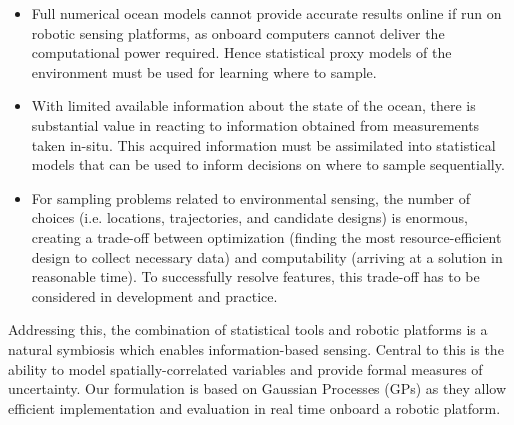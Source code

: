 \documentclass[aoas]{imsart}
\begin{document}
\begin{itemize}

\item Full numerical ocean models cannot provide accurate results
  online if run on robotic sensing platforms, as onboard computers
  cannot deliver the computational power required. Hence statistical
  proxy models of the environment must be used for learning where to sample.

\item With limited available information about the state of the ocean, there is substantial value in reacting to
  information obtained from measurements taken in-situ. This
  acquired information must be assimilated into statistical models that
  can be used to inform decisions on where to sample
  sequentially.%

\item For sampling problems related to environmental sensing, the
  number of choices (i.e. locations, trajectories, and candidate
  designs) is enormous, creating a
  trade-off between optimization (finding the most resource-efficient
  design to collect necessary data) and computability (arriving at a
  solution in reasonable time). To successfully resolve features, this
  trade-off has to be considered in development and practice.

\end{itemize}

Addressing this, the combination of statistical tools and robotic platforms is a
natural symbiosis which enables information-based sensing. Central to
this is the ability to model spatially-correlated variables and
provide formal measures of uncertainty. Our formulation is based on
Gaussian Processes (GPs) as they allow efficient implementation 
and evaluation in real time onboard a robotic platform.


\end{document}
